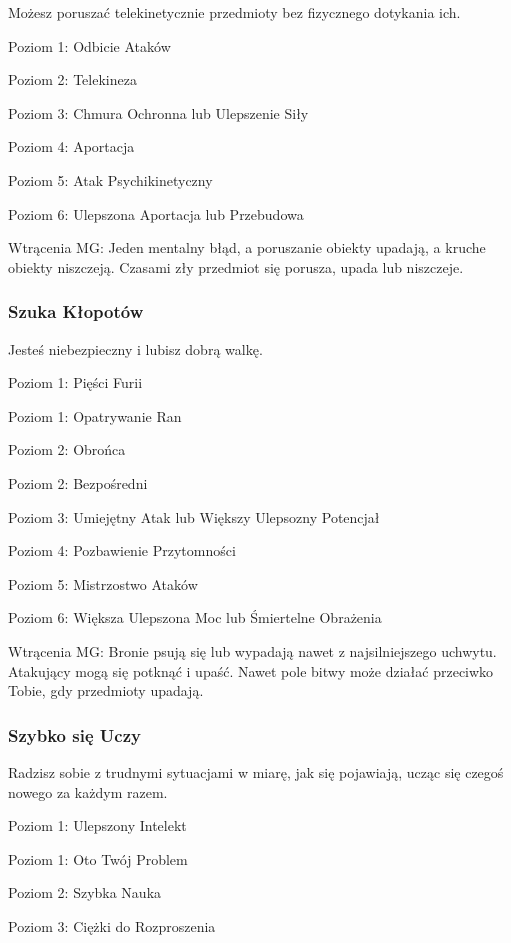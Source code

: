 Możesz poruszać telekinetycznie przedmioty bez fizycznego dotykania ich.

Poziom 1: Odbicie Ataków

Poziom 2: Telekineza

Poziom 3: Chmura Ochronna lub Ulepszenie Siły

Poziom 4: Aportacja

Poziom 5: Atak Psychikinetyczny

Poziom 6: Ulepszona Aportacja lub Przebudowa

Wtrącenia MG: Jeden mentalny błąd, a poruszanie obiekty upadają, a kruche obiekty niszczeją. Czasami zły przedmiot się porusza, upada lub niszczeje.

\subsubsection{Szuka Kłopotów}

Jesteś niebezpieczny i lubisz dobrą walkę.

Poziom 1: Pięści Furii

Poziom 1: Opatrywanie Ran

Poziom 2: Obrońca

Poziom 2: Bezpośredni

Poziom 3: Umiejętny Atak lub Większy Ulepsozny Potencjał

Poziom 4: Pozbawienie Przytomności

Poziom 5: Mistrzostwo Ataków

Poziom 6: Większa Ulepszona Moc lub Śmiertelne Obrażenia

Wtrącenia MG: Bronie psują się lub wypadają nawet z najsilniejszego uchwytu. Atakujący mogą się potknąć i upaść. Nawet pole bitwy może działać przeciwko Tobie, gdy przedmioty upadają.

\subsubsection{Szybko się Uczy}

Radzisz sobie z trudnymi sytuacjami w miarę, jak się pojawiają, ucząc się czegoś nowego za każdym razem.

Poziom 1: Ulepszony Intelekt

Poziom 1: Oto Twój Problem

Poziom 2: Szybka Nauka

Poziom 3: Ciężki do Rozproszenia

